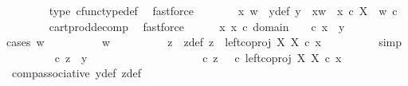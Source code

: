 \begin{isabellebody}
\ \ \ \ \ \ \isamarkupfalse%
\ {\isasymrho}{\isacharunderscore}{\kern0pt}type\ cfunc{\isacharunderscore}{\kern0pt}type{\isacharunderscore}{\kern0pt}def\ \isamarkupfalse%
\ fastforce\isanewline
\ \ \ \ \isamarkupfalse%
\ \isamarkupfalse%
\ x\ w\ \ y{\isacharunderscore}{\kern0pt}def{\isacharcolon}{\kern0pt}\ {\isachardoublequoteopen}y\ {\isacharequal}{\kern0pt}\ {\isasymlangle}x{\isacharcomma}{\kern0pt}w{\isasymrangle}\ {\isasymand}\ x\ {\isasymin}\isactrlsub c\ X\ {\isasymand}\ w\ {\isasymin}\isactrlsub c\ {\isasymOmega}{\isachardoublequoteclose}\isanewline
\ \ \ \ \ \ \isamarkupfalse%
\ cart{\isacharunderscore}{\kern0pt}prod{\isacharunderscore}{\kern0pt}decomp\ \isamarkupfalse%
\ fastforce\isanewline
\ \ \ \ \isamarkupfalse%
\ {\isachardoublequoteopen}{\isasymexists}x{\isachardot}{\kern0pt}\ x\ {\isasymin}\isactrlsub c\ domain\ {\isasymrho}\ {\isasymand}\ {\isasymrho}\ {\isasymcirc}\isactrlsub c\ x\ {\isacharequal}{\kern0pt}\ y{\isachardoublequoteclose}\isanewline
\ \ \ \ \isamarkupfalse%
{\isacharparenleft}{\kern0pt}cases\ {\isachardoublequoteopen}w\ {\isacharequal}{\kern0pt}\ {\isasymt}{\isachardoublequoteclose}{\isacharparenright}{\kern0pt}\isanewline
\ \ \ \ \ \ \isamarkupfalse%
\ {\isachardoublequoteopen}w\ {\isacharequal}{\kern0pt}\ {\isasymt}{\isachardoublequoteclose}\isanewline
\ \ \ \ \ \ \isamarkupfalse%
\ z\ \ z{\isacharunderscore}{\kern0pt}def{\isacharcolon}{\kern0pt}\ {\isachardoublequoteopen}z\ {\isacharequal}{\kern0pt}\ left{\isacharunderscore}{\kern0pt}coproj\ X\ X\ {\isasymcirc}\isactrlsub c\ x{\isachardoublequoteclose}\isanewline
\ \ \ \ \ \ \ \ \isamarkupfalse%
\ simp\isanewline
\ \ \ \ \ \ \isamarkupfalse%
\ {\isachardoublequoteopen}{\isasymrho}\ {\isasymcirc}\isactrlsub c\ z\ {\isacharequal}{\kern0pt}\ y{\isachardoublequoteclose}\isanewline
\ \ \ \ \ \ \isamarkupfalse%
\ {\isacharminus}{\kern0pt}\ \isanewline
\ \ \ \ \ \ \ \ \isamarkupfalse%
\ {\isachardoublequoteopen}{\isasymrho}\ {\isasymcirc}\isactrlsub c\ z\ {\isacharequal}{\kern0pt}\ {\isacharparenleft}{\kern0pt}{\isasymrho}\ {\isasymcirc}\isactrlsub c\ left{\isacharunderscore}{\kern0pt}coproj\ X\ X{\isacharparenright}{\kern0pt}\ {\isasymcirc}\isactrlsub c\ x{\isachardoublequoteclose}\isanewline
\ \ \ \ \ \ \ \ \ \ \isamarkupfalse%
\ comp{\isacharunderscore}{\kern0pt}associative{}\ y{\isacharunderscore}{\kern0pt}def\ z{\isacharunderscore}{\kern0pt}def\ \isamarkupfalse%

\end{isabellebody}

